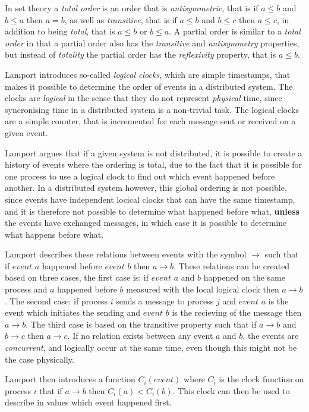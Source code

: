 		\newpar In set theory a \textit{total order} is an order that is \textit{antisymmetric}, that is if $a \leq b$ and $b \leq a$ then $a = b$, as well as \textit{transitive}, that is if $a \leq b$ and $b \leq c$ then $a \leq c$, in addition to being \textit{total}, that is $a \leq b$ or $b \leq a$. A partial order is similar to a \textit{total order} in that a partial order also has the \textit{transitive} and \textit{antisymmetry} properties, but instead of \textit{totality} the partial order has the \textit{reflexivity} property, that is $a \leq b$. 
		
		\newpar Lamport introduces so-called \textit{logical clocks}, which are simple timestamps, that makes it possible to determine the order of events in a distributed system. The clocks are \textit{logical} in the sense that they do not represent \textit{physical} time, since syncronising time in a distributed system is a non-trivial task. The logical clocks are a simple counter, that is incremented for each message sent or received on a given event. 
		
		\newpar Lamport argues that if a given system is not distributed, it is possible to create a history of events where the ordering is total, due to the fact that it is possible for one process to use a logical clock to find out which event happened before another. In a distributed system however, this global ordering is not possible, since events have independent locical clocks that can have the same timestamp, and it is therefore not possible to determine what happened before what, \textbf{unless} the events have exchanged messages, in which case it is possible to determine what happens before what.
		
		\newpar Lamport describes these relations between events with the symbol $\rightarrow$ such that if $event$ $a$ happened before $event$ $b$ then $a \rightarrow b$. These relations can be created based on three cases, the first case is: if $event$ $a$ and $b$ happened on the same process and $a$ happened before $b$ measured with the local logical clock then $a \rightarrow b$. The second case: if process $i$ sends a message to process $j$ and $event$ $a$ is the event which initiates the sending and $event$ $b$ is the recieving of the message then $a \rightarrow b$. The third case is based on the transitive property such that if $a \rightarrow b$ and $b \rightarrow c$ then $a \rightarrow c$. If no relation exists between any event $a$ and $b$, the events are \textit{concurrent}, and logically occur at the same time, even though this might not be the case physically. 
		
		\newpar Lamport then introduces a function $C_i(event)$ where $C_i$ is the clock function on process $i$ that if $a \rightarrow b$ then $C_i(a) < C_i(b)$. This clock can then be used to describe in values which event happened first. 
		